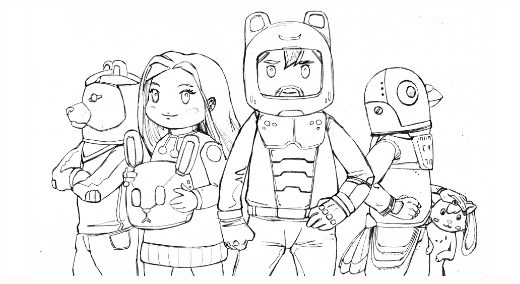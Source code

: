 \vspace*{\fill}

\includegraphics[width=.7\paperwidth]{Assets/cosmoose_cover_line_small}

\clearpage
